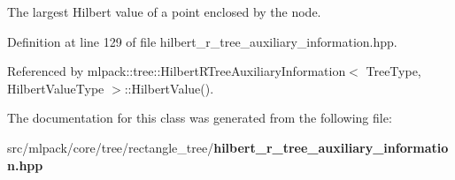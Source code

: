 The largest Hilbert value of a point enclosed by the node. 



Definition at line 129 of file hilbert\+\_\+r\+\_\+tree\+\_\+auxiliary\+\_\+information.\+hpp.



Referenced by mlpack\+::tree\+::\+Hilbert\+R\+Tree\+Auxiliary\+Information$<$ Tree\+Type, Hilbert\+Value\+Type $>$\+::\+Hilbert\+Value().



The documentation for this class was generated from the following file\+:\begin{DoxyCompactItemize}
\item 
src/mlpack/core/tree/rectangle\+\_\+tree/{\bf hilbert\+\_\+r\+\_\+tree\+\_\+auxiliary\+\_\+information.\+hpp}\end{DoxyCompactItemize}
